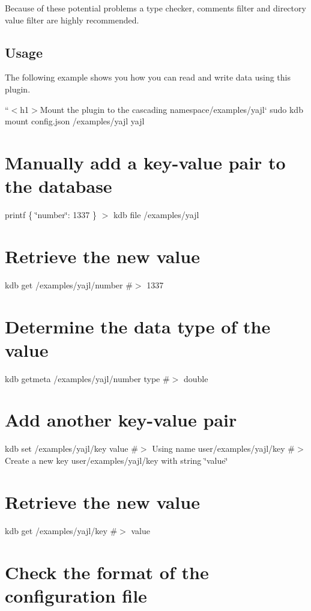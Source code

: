 Because of these potential problems a type checker, comments filter and directory value filter are highly recommended.

\subsection*{Usage}

The following example shows you how you can read and write data using this plugin.

``{\ttfamily  $<$h1$>$Mount the plugin to the cascading namespace}/examples/yajl` sudo kdb mount config.\+json /examples/yajl yajl

\section*{Manually add a key-\/value pair to the database}

printf \textquotesingle{}\{ \char`\"{}number\char`\"{}\+: 1337 \}\textquotesingle{} $>$ {\ttfamily kdb file /examples/yajl}

\section*{Retrieve the new value}

kdb get /examples/yajl/number \#$>$ 1337

\section*{Determine the data type of the value}

kdb getmeta /examples/yajl/number type \#$>$ double

\section*{Add another key-\/value pair}

kdb set /examples/yajl/key value \#$>$ Using name user/examples/yajl/key \#$>$ Create a new key user/examples/yajl/key with string \char`\"{}value\char`\"{}

\section*{Retrieve the new value}

kdb get /examples/yajl/key \#$>$ value

\section*{Check the format of the configuration file}

